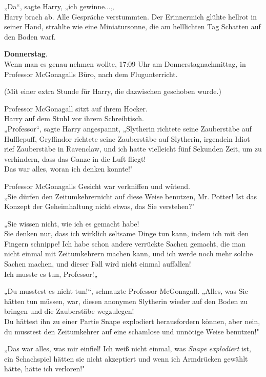 {„Da“, sagte Harry, „ich gewinne...„\\ Harry brach ab. Alle Gespräche verstummten. Der Erinnermich glühte hellrot in seiner Hand, strahlte wie eine Miniatursonne, die am helllichten Tag Schatten auf den Boden warf.

\textbf{Donnerstag}.\\ Wenn man es genau nehmen wollte, 17:09 Uhr am Donnerstagnachmittag, in Professor McGonagalls Büro, nach dem Flugunterricht.

(Mit einer extra Stunde für Harry, die dazwischen geschoben wurde.)

Professor McGonagall sitzt auf ihrem Hocker.\\ Harry auf dem Stuhl vor ihrem Schreibtisch.\\ „Professor“, sagte Harry angespannt, „Slytherin richtete seine Zauberstäbe auf Hufflepuff, Gryffindor richtete seine Zauberstäbe auf Slytherin, irgendein Idiot rief Zauberstäbe in Ravenclaw, und ich hatte vielleicht fünf Sekunden Zeit, um zu verhindern, dass das Ganze in die Luft fliegt!\\ Das war alles, woran ich denken konnte!"

Professor McGonagalls Gesicht war verkniffen und wütend.\\ „Sie dürfen den Zeitumkehrernicht auf diese Weise benutzen, Mr. Potter! Ist das Konzept der Geheimhaltung nicht etwas, das Sie verstehen?"

„Sie wissen nicht, wie ich es gemacht habe!\\ Sie denken nur, dass ich wirklich seltsame Dinge tun kann, indem ich mit den Fingern schnippe! Ich habe schon andere verrückte Sachen gemacht, die man nicht einmal mit Zeitumkehrern machen kann, und ich werde noch mehr solche Sachen machen, und dieser Fall wird nicht einmal auffallen!\\ Ich musste es tun, Professor!„

„Du musstest es nicht tun!“, schnauzte Professor McGonagall. „Alles, was Sie hätten tun müssen, war, diesen anonymen Slytherin wieder auf den Boden zu bringen und die Zauberstäbe wegzulegen!\\ Du hättest ihn zu einer Partie Snape explodiert herausfordern können, aber nein, du musstest den Zeitumkehrer auf eine schamlose und unnötige Weise benutzen!"

„Das war alles, was mir einfiel! Ich weiß nicht einmal, was \emph{Snape explodiert} ist, ein Schachspiel hätten sie nicht akzeptiert und wenn ich Armdrücken gewählt hätte, hätte ich verloren!"

}
